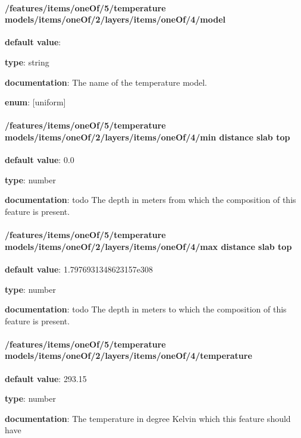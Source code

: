 \paragraph{/features/items/oneOf/5/temperature models/items/oneOf/2/layers/items/oneOf/4/model} \begin{itemized}
\item {\bf default value}: 
\item {\bf type}: string
\item {\bf documentation}: The name of the temperature model.
\item {\bf enum}: [uniform]\end{itemized}\paragraph{/features/items/oneOf/5/temperature models/items/oneOf/2/layers/items/oneOf/4/min distance slab top} \begin{itemized}
\item {\bf default value}: 0.0
\item {\bf type}: number
\item {\bf documentation}: todo The depth in meters from which the composition of this feature is present.
\end{itemized}\paragraph{/features/items/oneOf/5/temperature models/items/oneOf/2/layers/items/oneOf/4/max distance slab top} \begin{itemized}
\item {\bf default value}: 1.7976931348623157e308
\item {\bf type}: number
\item {\bf documentation}: todo The depth in meters to which the composition of this feature is present.
\end{itemized}\paragraph{/features/items/oneOf/5/temperature models/items/oneOf/2/layers/items/oneOf/4/temperature} \begin{itemized}
\item {\bf default value}: 293.15
\item {\bf type}: number
\item {\bf documentation}: The temperature in degree Kelvin which this feature should have

\end{itemized}
